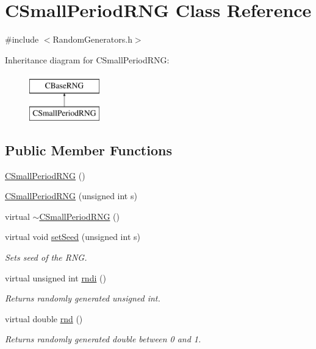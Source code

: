 \hypertarget{class_c_small_period_r_n_g}{\section{C\-Small\-Period\-R\-N\-G Class Reference}
\label{class_c_small_period_r_n_g}
}


{\ttfamily \#include $<$Random\-Generators.\-h$>$}

Inheritance diagram for C\-Small\-Period\-R\-N\-G\-:\begin{figure}[H]
\begin{center}
\leavevmode
\includegraphics[height=2.000000cm]{class_c_small_period_r_n_g}
\end{center}
\end{figure}
\subsection*{Public Member Functions}
\begin{DoxyCompactItemize}
\item 
\hyperlink{class_c_small_period_r_n_g_a2458f1138fd465ec27c1dc8906083dba}{C\-Small\-Period\-R\-N\-G} ()
\item 
\hyperlink{class_c_small_period_r_n_g_ae06d2e0294e19d39dbb9318488c621bf}{C\-Small\-Period\-R\-N\-G} (unsigned int s)
\item 
virtual \hyperlink{class_c_small_period_r_n_g_a2946da46c82a1d5790a729390e7aa187}{$\sim$\-C\-Small\-Period\-R\-N\-G} ()
\item 
virtual void \hyperlink{class_c_small_period_r_n_g_a7a799121f858fd32c8300970ab46a26a}{set\-Seed} (unsigned int s)
\begin{DoxyCompactList}\small\item\em Sets seed of the R\-N\-G. \end{DoxyCompactList}\item 
virtual unsigned int \hyperlink{class_c_small_period_r_n_g_a60061ed8dc92ede13ad2a4579023e792}{rndi} ()
\begin{DoxyCompactList}\small\item\em Returns randomly generated unsigned int. \end{DoxyCompactList}\item 
virtual double \hyperlink{class_c_small_period_r_n_g_af82a1d5b0232cd7dc4b73114e632057c}{rnd} ()
\begin{DoxyCompactList}\small\item\em Returns randomly generated double between 0 and 1. \end{DoxyCompactList}\end{DoxyCompactItemize}
